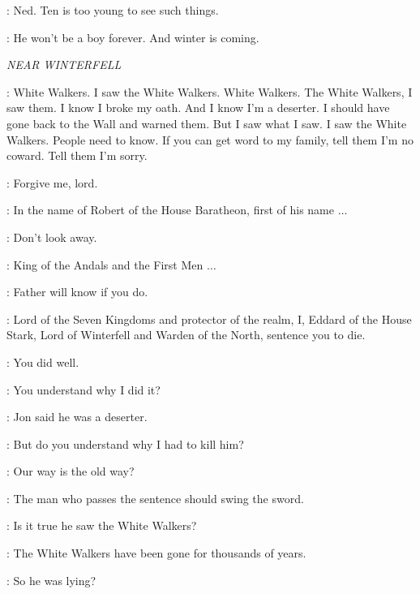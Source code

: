 \CATELYN: Ned. Ten is too young to see such things. 

\NED: He won't be a boy forever. And winter is coming. 


\scene

\textit{NEAR WINTERFELL} 


\WILL: White Walkers. I saw the White Walkers. White Walkers. The White Walkers, I saw them. I know I broke my oath. And I know I'm a deserter. I should have gone back to the Wall and warned them. But I saw what I saw. I saw the White Walkers. People need to know. If you can get word to my family, tell them I'm no coward. Tell them I'm sorry. 


\WILL: Forgive me, lord. 

\NED: In the name of Robert of the House Baratheon, first of his name $\ldots$ 

\JON:  Don't look away. 

\NED: King of the Andals and the First Men $\ldots$ 

\JON: Father will know if you do. 

\NED: Lord of the Seven Kingdoms and protector of the realm, I, Eddard of the House Stark, Lord of Winterfell and Warden of the North, sentence you to die. 


\JON: You did well. 


\NED: You understand why I did it? 

\BRAN: Jon said he was a deserter. 

\NED: But do you understand why I had to kill him? 

\BRAN: Our way is the old way? 

\NED: The man who passes the sentence should swing the sword. 

\BRAN: Is it true he saw the White Walkers? 

\NED: The White Walkers have been gone for thousands of years. 

\BRAN: So he was lying? 

